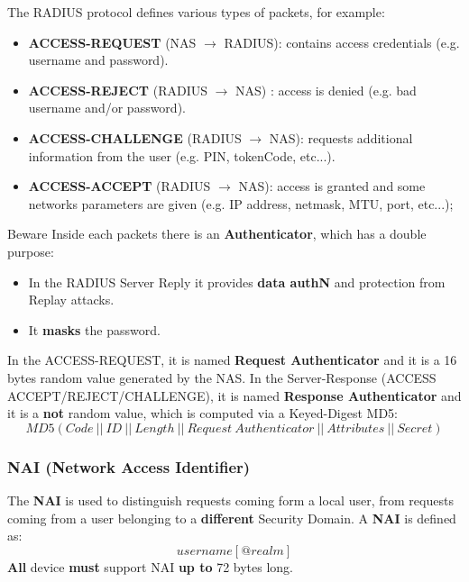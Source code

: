 \newpage
The RADIUS protocol defines various types of packets, for example:
\begin{itemize}
    \item \textbf{ACCESS-REQUEST} (NAS \(\rightarrow \) RADIUS): contains access credentials (e.g. username and password).
    \item \textbf{ACCESS-REJECT} (RADIUS \(\rightarrow \) NAS) : access is denied (e.g. bad username and/or password).
    \item \textbf{ACCESS-CHALLENGE} (RADIUS \(\rightarrow \) NAS): requests additional information from the user (e.g. PIN, tokenCode, etc...).
    \item \textbf{ACCESS-ACCEPT} (RADIUS \(\rightarrow \) NAS): access is granted and some networks parameters are given (e.g.
    IP address, netmask, MTU, port, etc...); 
\end{itemize}
\noindent
\vspace{-0.5cm}
\begin{quotebox-red}{Beware}
    Inside each packets there is an \textbf{Authenticator}, which has a double purpose:
    \begin{itemize}
        \item In the RADIUS Server Reply it provides \textbf{data authN} and protection from Replay attacks.
        \item It \textbf{masks} the password.
    \end{itemize}
    In the ACCESS-REQUEST, it is named \textbf{Request Authenticator} and it is a 16 bytes random value generated by the NAS. In the Server-Response (ACCESS ACCEPT/REJECT/CHALLENGE), it is named \textbf{Response Authenticator} and it is a \textbf{not} random value, which is computed via a Keyed-Digest MD5:
    \[
        MD5(Code\ ||\ ID\ ||\ Length\ ||\ Request\ Authenticator\ ||\ Attributes\ ||\ Secret)
    \]
\end{quotebox-red}

\begin{customquote}
\vspace{-0.4cm}
\subsubsection{NAI (Network Access Identifier)}
The \textbf{NAI} is used to distinguish requests coming form a local user, from requests coming from a user belonging to a \textbf{different} Security Domain. A \textbf{NAI} is defined as:\[ username[@realm]\]
\textbf{All} device \textbf{must} support NAI \textbf{up to} 72 bytes long.
\end{customquote}

